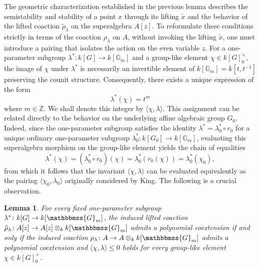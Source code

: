\documentclass[11pt,a4paper,reqno,noamsfonts]{amsart}
\numberwithin{equation}{section}
\newtheorem{lemma}[theorem]{Lemma}
\theoremstyle{definition}
\theoremstyle{remark}
\newcommand{\GG}{\ensuremath{\mathbbmss{G}}}
\begin{document}
The geometric characterization established in the previous lemma describes the semistability and stability of a point $x$ through its lifting $\tilde{x}$ and the behavior of the lifted coaction $\tilde{\rho}_{\lambda}$ on the superalgebra $A[z]$. To reformulate these conditions strictly in terms of the coaction $\rho_{\lambda}$ on $A$, without invoking the lifting $\tilde{x}$, one must introduce a pairing that isolates the action on the even variable $z$. For a one-parameter subgroup $\lambda^* \colon k[G] \to k[\mathbb{G}_m]$ and a group-like element $\chi \in k[G]_0^\times$, the image of $\chi$ under $\lambda^*$ is necessarily an invertible element of $k[\mathbb{G}_m] = k[t,t^{-1}]$ preserving the counit structure. Consequently, there exists a unique expression of the form
\begin{equation}
\lambda^*(\chi) = t^m
\end{equation}
where $m \in \mathbb{Z}$. We shall denote this integer by $\langle \chi, \lambda \rangle$. This assignment can be related directly to the behavior on the underlying affine algebraic group $G_0$. Indeed, since the one-parameter subgroup satisfies the identity $\lambda^* = \lambda_0^* \circ r_0$ for a unique ordinary one-parameter subgroup $\lambda_0^* \colon k[G_0] \to k[\mathbb{G}_m]$, evaluating this superalgebra morphism on the group-like element yields the chain of equalities
\begin{equation}
\lambda^*(\chi) = (\lambda_0^* \circ r_0)(\chi) = \lambda_0^*(r_0(\chi)) = \lambda_0^*(\chi_0),
\end{equation}
from which it follows that the invariant $\langle \chi, \lambda \rangle$ can be evaluated equivalently as the pairing $\langle \chi_0, \lambda_0 \rangle$ originally considered by King. The following is a crucial observation. 

\begin{lemma}\label{lem:4.11}
For every fixed one-parameter subgroup $\lambda^* \colon k[G] \to k[\GG_m]$, the induced lifted coaction $\tilde{\rho}_{\lambda} \colon A[z] \to A[z] \otimes_k k[\GG_m]$ admits a polynomial coextension if and only if the induced coaction $\rho_{\lambda} \colon A \to A \otimes_k k[\GG_m]$ admits a polynomial coextension and $\langle \chi, \lambda \rangle \le 0$ holds for every group-like element $\chi \in k[G]_0^\times$.
\end{lemma}
\end{document}

